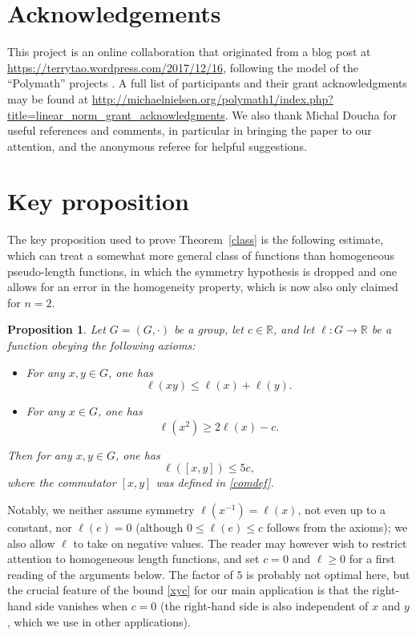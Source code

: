 \documentclass[11pt,a4paper,reqno]{amsart}
\numberwithin{equation}{section}
\theoremstyle{plain}
\newtheorem{proposition}[equation]{Proposition}
\theoremstyle{definition}
\newcommand\R{\mathbb{R}}
\newcommand\normsymb{\ell}  %
\newcommand\norm[1]{\ell({#1})}   %
\begin{document}
\section*{Acknowledgements}

This project is an online collaboration that originated from a blog post
at \url{https://terrytao.wordpress.com/2017/12/16}, following the model
of the ``Polymath'' projects \cite{gn}.  A full list of participants and
their grant acknowledgments may be found at
{\small
\url{http://michaelnielsen.org/polymath1/index.php?title=linear\_norm\_grant\_acknowledgments}}.
We also thank Michal Doucha for useful references and comments, in
particular in bringing the paper \cite{Niem} to our attention, and the
anonymous referee for helpful suggestions.


\section{Key proposition}

The key proposition used to prove Theorem~\ref{class} is the following
estimate, which can treat a somewhat more general class of functions than
homogeneous pseudo-length functions, in which the symmetry hypothesis is
dropped and one allows for an error in { the homogeneity
property}, which is now { also} only claimed for $n=2$.

\begin{proposition}\label{main}
Let $G = (G,\cdot)$ be a group, let { $c \in \R$}, and let
$\normsymb: G \to \R$ be a function obeying the following axioms:
\begin{itemize}
\item[(i)]  For any $x,y \in G$, one has
\begin{equation}\label{ng}
 \norm{xy} \leq \norm{x}+\norm{y}.
\end{equation}
\item[(ii)]  For any $x \in G$, one has
\begin{equation}\label{double}
 \norm{x^2} \geq 2\norm{x} - { c}.
\end{equation}
\end{itemize}
Then for any $x,y \in G$, one has
\begin{equation}\label{xyc}
 \norm{ [x,y] } \leq { 5 c},
\end{equation}
where the commutator $[x,y]$ was defined in \eqref{comdef}.
\end{proposition}

Notably, we neither assume symmetry $\norm{ x^{-1} } = \norm{ x }$, not
even up to a constant, nor $\norm{ e } = 0$ { (although $0
\leq \norm{ e } \leq c$ follows from the axioms)}; we also allow
$\normsymb$ to take on negative values. The reader may however wish to
restrict attention to { homogeneous} length functions, and
set { $c=0$ and $\normsymb \geq 0$} for a first reading of
the arguments below.  The { factor of $5$ is} probably not
optimal here, but the crucial feature of the bound \eqref{xyc} for our
main application is that the right-hand side vanishes when {
$c=0$} (the right-hand side is also independent of $x$ and $y$, which we
use in other applications).
\end{document}

